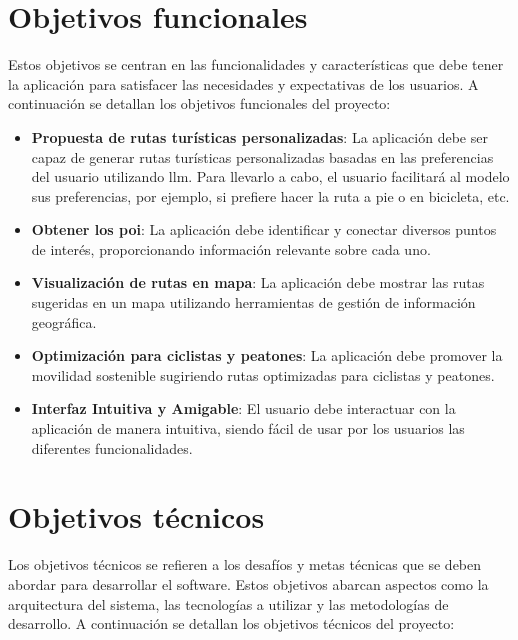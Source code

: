 
\section{Objetivos funcionales}

Estos objetivos se centran en las funcionalidades y características que debe tener la aplicación para satisfacer las necesidades y expectativas de los usuarios. A continuación se detallan los objetivos funcionales del proyecto:

\begin{itemize}
    \item \textbf{Propuesta de rutas turísticas personalizadas}: La aplicación debe ser capaz de generar rutas turísticas personalizadas basadas en las preferencias del usuario utilizando \acrfull{llm}. Para llevarlo a cabo, el usuario facilitará al modelo sus preferencias, por ejemplo, si prefiere hacer la ruta a pie o en bicicleta, etc.
    \item \textbf{Obtener los \acrfull{poi}}: La aplicación debe identificar y conectar diversos puntos de interés, proporcionando información relevante sobre cada uno.
    \item \textbf{Visualización de rutas en mapa}: La aplicación debe mostrar las rutas sugeridas en un mapa utilizando herramientas de gestión de información geográfica.
    \item \textbf{Optimización para ciclistas y peatones}: La aplicación debe promover la movilidad sostenible sugiriendo rutas optimizadas para ciclistas y peatones.
    \item \textbf{Interfaz Intuitiva y Amigable}: El usuario debe interactuar con la aplicación de manera intuitiva, siendo fácil de usar por los usuarios las diferentes funcionalidades.
\end{itemize}

\section{Objetivos técnicos}

Los objetivos técnicos se refieren a los desafíos y metas técnicas que se deben abordar para desarrollar el software. Estos objetivos abarcan aspectos como la arquitectura del sistema, las tecnologías a utilizar y las metodologías de desarrollo. A continuación se detallan los objetivos técnicos del proyecto:

